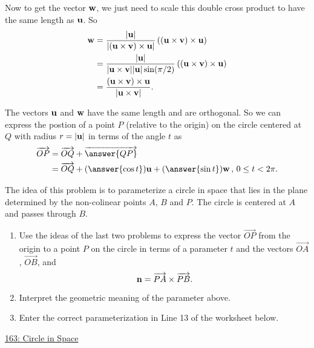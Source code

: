\documentclass{ximera}
\begin{document}
\begin{question}
\begin{explanation}
Now to get the vector ${\bf w}$, we just need to scale this double cross product to have the same length as ${\bf u}$. So
\begin{align*}
    {\bf w} &= \frac{|{\bf u}|}{|({\bf u}\times {\bf v})\times {\bf u}|}  \left(  ({\bf u}\times {\bf v})\times {\bf u}\right) \\
                &=\frac{|{\bf u}|}{|{\bf u}\times{\bf v}||{\bf u}| \sin(\pi/2)}  \left(  ({\bf u}\times {\bf v})\times {\bf u}\right) \\
                &= \frac{({\bf u}\times {\bf v})\times {\bf u}}{|{\bf u}\times {\bf v}|} .
\end{align*}

The vectors ${\bf u}$ and ${\bf w}$ have the same length and are orthogonal. So we can express the postion of a point $P$ (relative to the origin) on the circle centered at $Q$ with radius $r = |{\bf u}|$ in terms of the angle $t$ as
\begin{align*}
   \overrightarrow{OP}  &= \overrightarrow{OQ} + \overrightarrow{\answer{QP}} \\
                                  &= \overrightarrow{OQ} + (\answer{\cos t}) {\bf u} + (\answer{\sin t}){\bf w} \, , \, 0\leq t < 2\pi .  
\end{align*}

\end{explanation}


\end{question}


\begin{question}  \label{Q9df43r23rfddfs}
The idea of this problem is to parameterize a circle in space that lies in the plane determined by the non-colinear points $A$, $B$ and $P$. The circle is centered at $A$ and passes through $B$.

\begin{enumerate}
\item{Use the ideas of the last two problems to express the vector $\overrightarrow{OP}$ from the origin to a point $P$ on the circle in terms of a parameter $t$ and the vectors $\overrightarrow{OA}$, $\overrightarrow{OB}$, and
\[
   {\bf n} = \overrightarrow{PA} \times \overrightarrow{PB} .
\]
}

\item{Interpret the geometric meaning of the parameter above.}

\item{Enter the correct parameterization in Line 13 of the worksheet below.}

\end{enumerate}


\begin{onlineOnly}
    \begin{center}
\end{center}
\end{onlineOnly}

\href{https://www.desmos.com/3d/4qvuqtp4lo}{163: Circle in Space}

\end{question}
\end{document}
